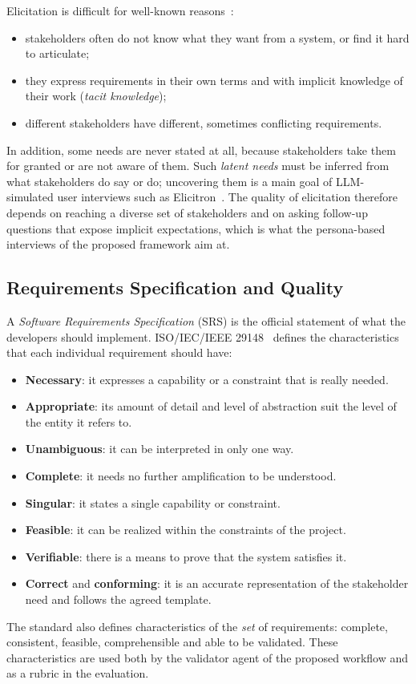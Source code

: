 Elicitation is difficult for well-known reasons~\cite{sommerville2015software}:
\begin{itemize}
    \item stakeholders often do not know what they want from a system, or find it hard to articulate;
    \item they express requirements in their own terms and with implicit knowledge of their work (\emph{tacit knowledge});
    \item different stakeholders have different, sometimes conflicting requirements.
\end{itemize}
In addition, some needs are never stated at all, because stakeholders take them for granted or are not aware of them. Such \emph{latent needs} must be inferred from what stakeholders do say or do; uncovering them is a main goal of LLM-simulated user interviews such as Elicitron~\cite{ataei2025elicitron}.
The quality of elicitation therefore depends on reaching a diverse set of stakeholders and on asking follow-up questions that expose implicit expectations, which is what the persona-based interviews of the proposed framework aim at.

\subsection{Requirements Specification and Quality}
\label{sec:bg-specification}

A \emph{Software Requirements Specification} (SRS) is the official statement of what the developers should implement. ISO/IEC/IEEE 29148~\cite{iso29148} defines the characteristics that each individual requirement should have:
\begin{itemize}
    \item \textbf{Necessary}: it expresses a capability or a constraint that is really needed.
    \item \textbf{Appropriate}: its amount of detail and level of abstraction suit the level of the entity it refers to.
    \item \textbf{Unambiguous}: it can be interpreted in only one way.
    \item \textbf{Complete}: it needs no further amplification to be understood.
    \item \textbf{Singular}: it states a single capability or constraint.
    \item \textbf{Feasible}: it can be realized within the constraints of the project.
    \item \textbf{Verifiable}: there is a means to prove that the system satisfies it.
    \item \textbf{Correct} and \textbf{conforming}: it is an accurate representation of the stakeholder need and follows the agreed template.
\end{itemize}
The standard also defines characteristics of the \emph{set} of requirements: complete, consistent, feasible, comprehensible and able to be validated. These characteristics are used both by the validator agent of the proposed workflow and as a rubric in the evaluation.

